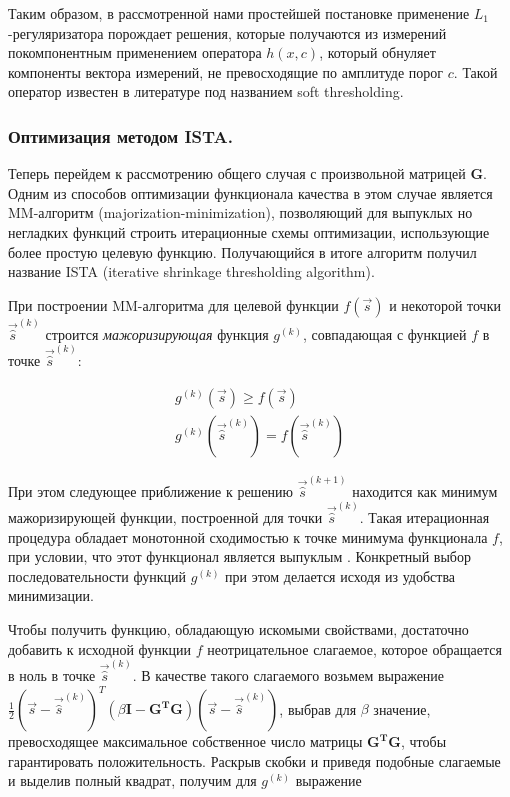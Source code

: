 Таким образом, в рассмотренной нами простейшей постановке применение
$L_1$-регуляризатора порождает решения, которые получаются из измерений
покомпонентным применением оператора $h(x, c)$, который обнуляет компоненты
вектора измерений, не превосходящие по амплитуде порог $c$.  Такой оператор
известен в литературе под названием soft thresholding.

\subsubsection{Оптимизация методом ISTA.}
\label{subsubsec:ista}

Теперь перейдем к рассмотрению общего случая с произвольной матрицей
$\mathbf{G}$.  Одним из способов оптимизации функционала качества в этом случае
является MM-алгоритм (majorization-minimization), позволяющий для выпуклых но
негладких функций строить итерационные схемы оптимизации, использующие более
простую целевую функцию. Получающийся в итоге алгоритм получил название
ISTA (iterative shrinkage thresholding algorithm).

При построении MM-алгоритма для целевой функции $f(\vec{s})$ и некоторой
точки $\vec{\hat{s}}^{(k)}$ строится \emph{мажоризирующая} функция $g^{(k)}$, совпадающая
с функцией $f$ в точке $\vec{\hat{s}}^{(k)}$:

\begin{gather*}
    g^{(k)}(\vec{s}) \geq f(\vec{s})\\
    g^{(k)}(\vec{\hat{s}}^{(k)}) = f(\vec{\hat{s}}^{(k)})
\end{gather*}

При этом следующее приближение к решению $\vec{\hat{s}}^{(k+1)}$ находится как
минимум мажоризирующей функции, построенной для точки $\vec{\hat{s}}^{(k)}$. Такая
итерационная процедура обладает монотонной сходимостью к точке минимума
функционала $f$, при условии, что этот функционал является выпуклым
\cite{combettes}.  Конкретный выбор последовательности функций $g^{(k)}$ при этом
делается исходя из удобства минимизации.

Чтобы получить функцию, обладающую искомыми свойствами, достаточно добавить к
исходной функции $f$ неотрицательное слагаемое, которое обращается в ноль в
точке $\vec{\hat{s}}^{(k)}$.  В качестве такого слагаемого возьмем выражение
$\frac{1}{2}(\vec{s} - \vec{\hat{s}}^{(k)})^T (\beta\mathbf{I - G^TG})(\vec{s} - \vec{\hat{s}}^{(k)})$,
выбрав для $\beta$ значение, превосходящее максимальное собственное число матрицы
$\mathbf{G^TG}$, чтобы гарантировать положительность. Раскрыв скобки и приведя подобные
слагаемые и выделив полный квадрат, получим для $g^{(k)}$ выражение

